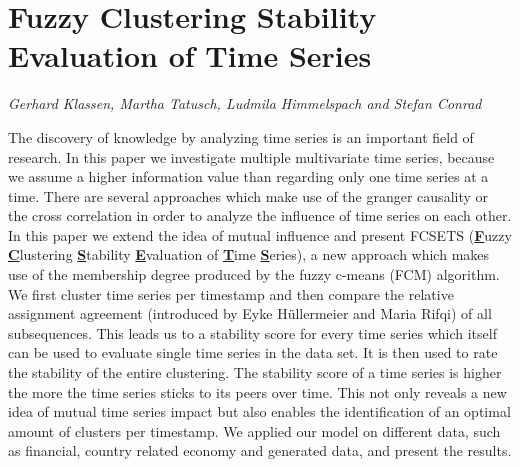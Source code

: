 \documentclass[../booklet.tex]{subfiles}
\begin{document}
\section[Fuzzy Clustering Stability Evaluation of Time Series. {\it Gerhard Klassen, Martha Tatusch, Ludmila Himmelspach and Stefan Conrad}]{Fuzzy Clustering Stability Evaluation of Time Series}
   

\begin{center}
  {\it Gerhard Klassen, Martha Tatusch, Ludmila Himmelspach and Stefan Conrad}
\end{center}

\vskip 0.8cm


The discovery of knowledge by analyzing time series is an important field of research. In this paper we investigate multiple multivariate time series, because we assume a higher information value than regarding only one time series at a time. There are several approaches which make use of the granger causality or the cross correlation in order to analyze the influence of time series on each other. In this paper we extend the idea of mutual influence and present FCSETS (\textbf{\underline{F}}uzzy \textbf{\underline{C}}lustering \textbf{\underline{S}}tability \textbf{\underline{E}}valuation of \textbf{\underline{T}}ime \textbf{\underline{S}}eries), a new approach which makes use of the membership degree produced by the fuzzy c-means (FCM) algorithm. We first cluster time series per timestamp and then compare the relative assignment agreement (introduced by Eyke H{\"u}ller\-meier and Maria Rifqi) of all subsequences. This leads us to a stability score for every time series which itself can be used to evaluate single time series in the data set. It is then used to rate the stability of the entire clustering. The stability score of a time series is higher the more the time series sticks to its peers over time. This not only reveals a new idea of mutual time series impact but also enables the identification of an optimal amount of clusters per timestamp.
We applied our model on different data, such as financial, country related economy and generated data, and present the results.

\end{document}
